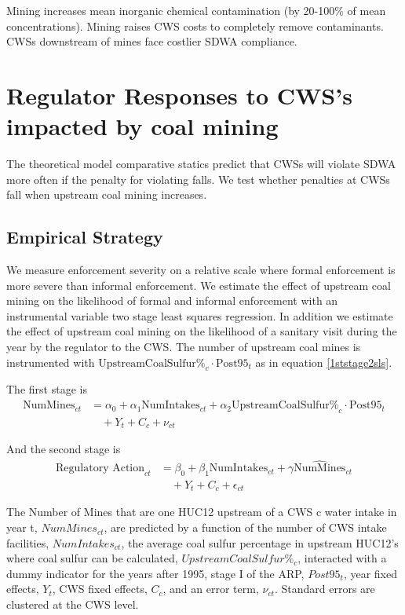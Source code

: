 \documentclass{article}
\begin{document}
Mining increases mean inorganic chemical contamination (by 20-100\%
of mean concentrations). Mining raises CWS costs to completely remove contaminants. CWSs downstream of mines face costlier SDWA compliance.

\section{Regulator Responses to CWS's impacted by coal mining}

The theoretical model comparative statics predict that CWSs will violate SDWA more often if the penalty for violating falls. We test whether penalties at CWSs fall when upstream coal mining increases.

\subsection{Empirical Strategy}

We measure enforcement severity on a relative scale where formal enforcement is more severe than informal enforcement. We estimate the effect of upstream coal mining on the likelihood of formal and informal enforcement with an instrumental variable two stage least squares regression. In addition we estimate the effect of upstream coal mining on the likelihood of a sanitary visit during the year by the regulator to the CWS. The number of upstream coal mines is instrumented with $\text{UpstreamCoalSulfur\%}_c \cdot \text{Post95}_t$ as in equation \ref{1ststage2sls}. 

The first stage is
\begin{equation}\label{1ststage2slsreg}
\begin{split}
\text{NumMines}_{ct} &= \alpha_0 + \alpha_1\text{NumIntakes}_{ct} + \alpha_2\text{UpstreamCoalSulfur\%}_c \cdot \text{Post95}_t \\
&\quad + Y_t + C_c + \nu_{ct}
\end{split}
\end{equation}

And the second stage is
\begin{equation}\label{2ndstage2slsreg}
\begin{split}
\text{Regulatory Action}_{ct} &= \beta_0 + \beta_1\text{NumIntakes}_{ct} + \gamma\widehat{\text{NumMines}}_{ct} \\
&\quad + Y_t + C_c + \epsilon_{ct}
\end{split}
\end{equation}

The Number of Mines that are one HUC12 upstream of a CWS c water intake in year t, $NumMines_{ct}$, are predicted by a function of the number of CWS intake facilities, $NumIntakes_{ct}$, the average coal sulfur percentage in upstream HUC12's where coal sulfur can be calculated, $UpstreamCoalSulfur\%_c$, interacted with a dummy indicator for the years after 1995, stage I of the ARP, $Post95_t$, year fixed effects, $Y_t$, CWS fixed effects, $C_c$, and an error term, $\nu_{ct}$. Standard errors are clustered at the CWS level.
\end{document}
